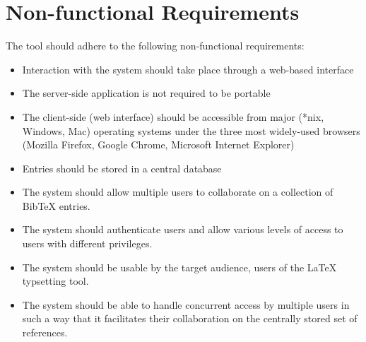 \documentclass{l3proj}
\begin{document}
\section*{Non-functional Requirements}
The tool should adhere to the following non-functional requirements:
\begin{itemize}
\item Interaction with the system should take place through a web-based interface
\item The server-side application is not required to be portable
\item The client-side (web interface) should be accessible from major (*nix, Windows, Mac) operating systems under the three most widely-used browsers (Mozilla Firefox, Google Chrome, Microsoft Internet Explorer)
\item Entries should be stored in a central database
\item The system should allow multiple users to collaborate on a collection of BibTeX entries.
\item The system should authenticate users and allow various levels of access to users with different privileges.
\item The system should be usable by the target audience, users of the LaTeX typsetting tool.
\item The system should be able to handle concurrent access by multiple users in such a way that it facilitates their collaboration on the centrally stored set of references.
\end{itemize}

































\end{document}
